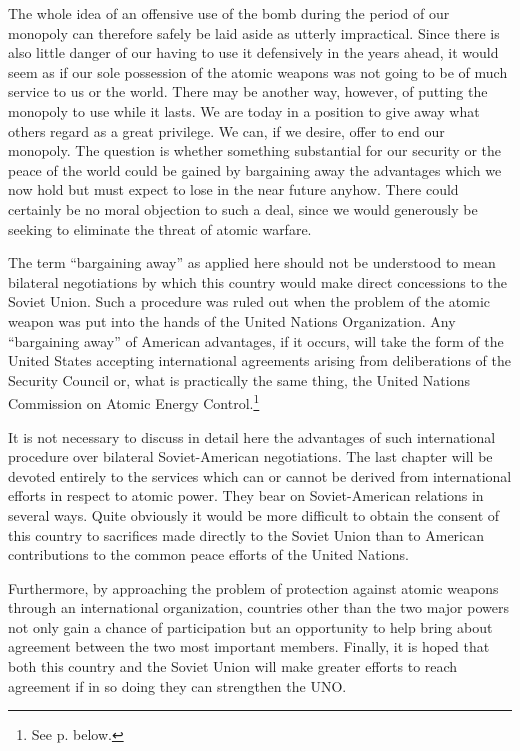 The whole idea of an offensive use of the bomb during the period of our monopoly can therefore safely be laid aside as utterly impractical. Since there is also little danger of our having to use it defensively in the years ahead, it would seem as if our sole possession of the atomic weapons was not going to be of much service to us or the world. There may be another way, however, of putting the monopoly to use while it lasts. We are today in a position to give away what others regard as a great privilege. We can, if we desire, offer to end our monopoly. The question is whether something substantial for our security or the peace of the world could be gained by bargaining away the advantages which we now hold but must expect to lose in the near future anyhow. There could certainly be no moral objection to such a deal, since we would generously be seeking to eliminate the threat of atomic warfare.

The term ``bargaining away'' as applied here should not be understood to mean bilateral negotiations by which this country would make direct concessions to the Soviet Union. Such a procedure was ruled out when the problem of the atomic weapon was put into the hands of the United Nations Organization. Any ``bargaining away'' of American advantages, if it occurs, will take the form of the United States accepting international agreements arising from deliberations of the Security Council or, what is practically the same thing, the United Nations Commission on Atomic Energy Control.\footnote{See p. \pageref{V-UNSC} below.}

It is not necessary to discuss in detail here the advantages of such international procedure over bilateral Soviet-American negotiations. The last chapter will be devoted entirely to the services which can or cannot be derived from international efforts in respect to atomic power. They bear on Soviet-American relations in several ways. Quite obviously it would be more difficult to obtain the consent of this country to sacrifices made directly to the Soviet Union than to American contributions to the common peace efforts of the United Nations.

Furthermore, by approaching the problem of protection against atomic weapons through an international organization, countries other than the two major powers not only gain a chance of participation but an opportunity to help bring about agreement between the two most important members. Finally, it is hoped that both this country and the Soviet Union will make greater efforts to reach agreement if in so doing they can strengthen the UNO.

